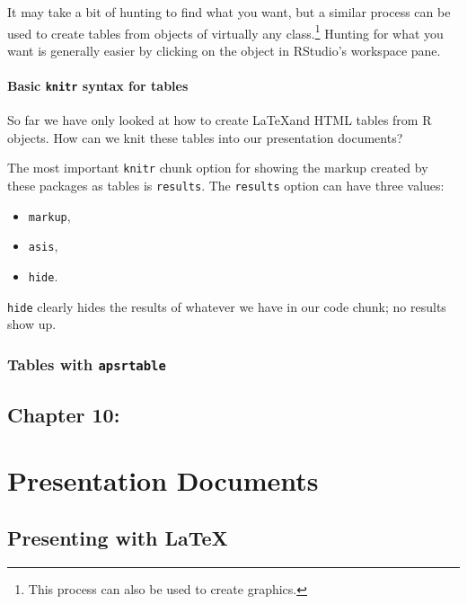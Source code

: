 \documentclass[ChapterTOCs,krantz1]{krantz}\usepackage{graphicx, color}
\begin{document}
It may take a bit of hunting to find what you want, but a similar process can be used to create tables from objects of virtually any class.\footnote{This process can also be used to create graphics.} Hunting for what you want is generally easier by clicking on the object in RStudio's workspace pane.

\subsection{Basic \texttt{knitr} syntax for tables}

So far we have only looked at how to create \LaTeX and HTML tables from R objects. How can we knit these tables into our presentation documents?

The most important \texttt{knitr} chunk option for showing the markup created by these packages as tables is \texttt{results}. The \texttt{results} option can have three values:

\begin{itemize}
\item
  \texttt{markup},
\item
  \texttt{asis},
\item
  \texttt{hide}.
\end{itemize}
\texttt{hide} clearly hides the results of whatever we have in our code chunk; no results show up.

\section{Tables with \texttt{apsrtable}}






\chapter{Chapter 10:}


\part{Presentation Documents}





\chapter{Presenting with \LaTeX}
\end{document}
